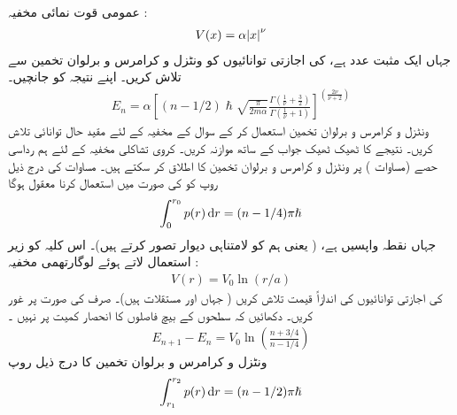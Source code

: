 عمومی قوت نمائی مخفیہ :
\begin{align*}
	V(x)=\alpha\abs{x}^{\nu}
\end{align*}
جہاں  ایک مثبت عدد ہے،  کی اجازتی توانائیوں کو ونٹزل و کرامرس و برلوان  تخمین سے تلاش کریں۔ اپنے نتیجہ کو  جانچیں۔ 
\begin{align}\label{مساوات_وقب_قوت_نمائی_نتیجہ}
	E_{n}=\alpha\left[(n-1/2)\hslash\sqrt{\frac{\pi}{2m\alpha}}\frac{\Gamma\left(\frac{1}{\nu}+\frac{3}{2}\right)}{\Gamma\left(\frac{1}{\nu}+1\right)}\right]^{\left(\frac{2\nu}{\nu+2}\right)}
\end{align}
 ونٹزل و کرامرس و برلوان   تخمین استعمال کر کے سوال   کے مخفیہ کے لئے مقید حال توانائی تلاش کریں۔ نتیجے کا ٹھیک ٹھیک جواب کے ساتھ موازنہ کریں۔  
کروی تشاکلی مخفیہ کے لئے ہم رداسی حصے  (مساوات )  پر ونٹزل و کرامرس و برلوان  تخمین کا اطلاق کر سکتے ہیں۔ مساوات   کی درج ذیل روپ کو  کی صورت میں استعمال کرنا معقول ہوگا 
\begin{align}
	\int^{r_{0}}_{0}p(r)\dif r=(n-1/4)\pi\hslash
\end{align}
جہاں  نقطہ واپسیں ہے، ( یعنی ہم  کو لامتناہی دیوار تصور کرتے ہیں)۔ اس کلیہ کو زیر استعمال لاتے ہوئے لوگارتھمی مخفیہ :
\begin{align*}
	V(r)=V_{0}\ln(r/a)
\end{align*}
کی اجازتی توانائیوں کی اندازاً قیمت تلاش کریں ( جہاں  اور  مستقلات ہیں)۔ صرف  کی صورت پر غور کریں۔ دکھائیں کہ سطحوں کے بیچ فاصلوں کا انحصار کمیت پر نہیں ۔
\begin{align*}
	E_{n+1}-E_{n}=V_{0}\ln\left(\frac{n+3/4}{n-1/4}\right)
\end{align*}
 ونٹزل و کرامرس و برلوان   تخمین کا  درج ذیل روپ
\begin{align}
	\int^{r_{2}}_{r_{1}}p(r)\dif r=(n-1/2)\pi\hslash
\end{align}
